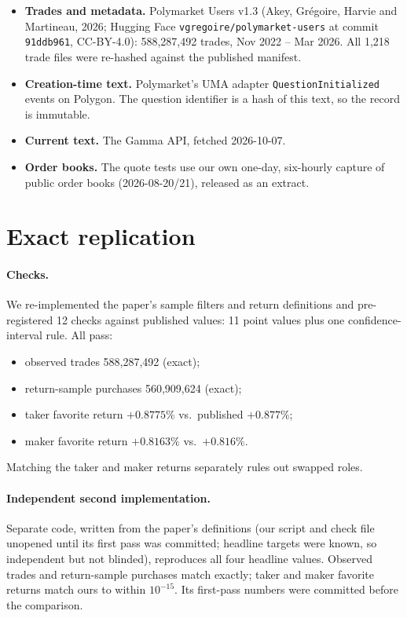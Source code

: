 \documentclass[10pt]{article}
\newcommand{\code}[1]{\texttt{#1}}
\begin{document}
\begin{itemize}
  \item \textbf{Trades and metadata.} Polymarket Users v1.3 (Akey, Gr\'egoire,
        Harvie and Martineau, 2026; Hugging Face
        \code{vgregoire/\allowbreak polymarket-users} at commit \code{91ddb961}, CC-BY-4.0): 588,287,492 trades, Nov 2022 -- Mar 2026.
        All 1,218 trade files were re-hashed against the published manifest.
  \item \textbf{Creation-time text.} Polymarket's UMA adapter
        \code{QuestionInitialized} events on Polygon. The question identifier
        is a hash of this text, so the record is immutable.
  \item \textbf{Current text.} The Gamma API, fetched 2026-10-07.
  \item \textbf{Order books.} The quote tests use our own one-day,
        six-hourly capture of public order books (2026-08-20/21), released as
        an extract.
\end{itemize}

\section{Exact replication}

\paragraph{Checks.} We re-implemented the paper's sample filters and return
definitions and pre-registered 12 checks against published values: 11 point
values plus one confidence-interval rule. All pass:
\begin{itemize}[nosep]
  \item observed trades 588,287,492 (exact);
  \item return-sample purchases 560,909,624 (exact);
  \item taker favorite return $+0.8775\%$ vs.\ published $+0.877\%$;
  \item maker favorite return $+0.8163\%$ vs.\ $+0.816\%$.
\end{itemize}
Matching the taker and maker returns separately rules out swapped roles.

\paragraph{Independent second implementation.} Separate code, written from the
paper's definitions (our script and check file unopened until its first pass
was committed; headline targets were known, so independent but not blinded), reproduces
all four headline values. Observed trades and return-sample purchases match
exactly; taker and maker favorite returns match ours to within $10^{-15}$. Its
first-pass numbers were committed before the comparison.
\end{document}

